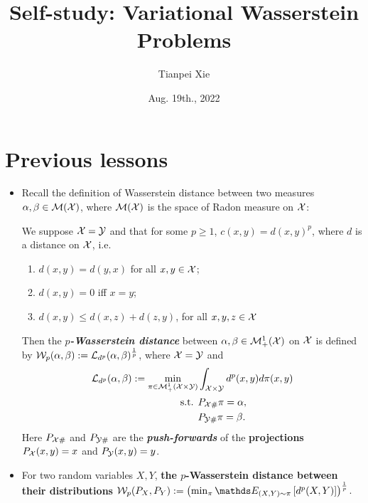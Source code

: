 \documentclass[11pt]{article}
\begin{document}
\title{Self-study: Variational Wasserstein Problems}
\author{Tianpei Xie}
\date{ Aug. 19th., 2022 }
\maketitle
\tableofcontents
\newpage
\section{Previous lessons}
\begin{itemize}
\item Recall the definition of Wasserstein distance between two measures $\alpha, \beta\in {\mathcal M}({\mathcal X})$, where ${\mathcal M}({\mathcal X})$ is the space of Radon measure on ${\mathcal X}$: 
\begin{definition}
We suppose ${\mathcal X} = {\mathcal Y}$ and that for some $p \ge 1$, $c(x,y)= d(x,y)^p$, where $d$ is a distance on ${\mathcal X}$, i.e. 
\begin{enumerate}
\item $d(x, y) = d(y, x)$ for all $x, y\in {\mathcal X}$; 
\item $d(x, y)  = 0$ iff  $x=y$;
\item $d(x, y) \le d(x, z) + d(z, y)$, for all $x, y, z \in {\mathcal X}$
\end{enumerate}
Then the \emph{\textbf{$p$-Wasserstein distance}} between $\alpha, \beta \in {\mathcal M}_{+}^{1}({\mathcal X})$ on ${\mathcal X}$ is defined by ${\mathcal W}_{p}(\alpha, \beta) := {\mathcal L}_{d^{p}}(\alpha, \beta)^{\frac{1}{p}}$, where ${\mathcal X} = {\mathcal Y}$ and 
\begin{align*}
 {\mathcal L}_{d^{p}}(\alpha, \beta) := \min_{\pi \in {\mathcal M}_{+}^{1}({\mathcal X} \times {\mathcal Y})}& \int_{{\mathcal X} \times {\mathcal Y}} d^{p}(x, y) d \pi(x, y)  \\
\text{s.t. }& P_{{\mathcal X} \#}\pi = \alpha,  \nonumber \\
& P_{{\mathcal Y} \#}\pi = \beta.  \nonumber
\end{align*} Here $P_{{\mathcal X} \#}$ and $P_{{\mathcal Y} \#}$ are the \emph{\textbf{push-forwards}}  of the \textbf{projections} $P_{{\mathcal X}}(x, y) = x$ and $P_{{\mathcal Y}}(x, y) = y$.
\end{definition}

\item For two random variables $X, Y$, \textbf{the  $p$-Wasserstein distance between their distributions} $\cW_{p}(P_{X}, P_{Y}) := \paren{\min_{\pi}\E{(X, Y)\sim \pi}{d^{p}(X,Y)}}^{\frac{1}{p}}$.


\end{itemize}
\end{document}
